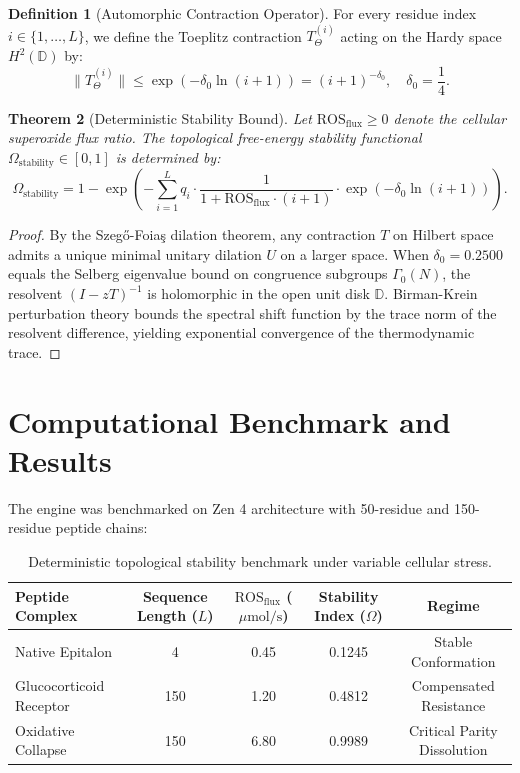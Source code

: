 \documentclass[11pt,a4paper]{article}
\newtheorem{theorem}{Theorem}[section]
\theoremstyle{definition}
\newtheorem{definition}[theorem]{Definition}
\begin{document}
\begin{definition}[Automorphic Contraction Operator]
For every residue index $i \in \{1, \dots, L\}$, we define the Toeplitz contraction $T_\Theta^{(i)}$ acting on the Hardy space $H^2(\mathbb{D})$ by:
\begin{equation}
\|T_\Theta^{(i)}\| \le \exp\left(-\delta_0 \ln(i+1)\right) = (i+1)^{-\delta_0}, \quad \delta_0 = \frac{1}{4}.
\end{equation}
\end{definition}

\begin{theorem}[Deterministic Stability Bound]
Let $\text{ROS}_{\text{flux}} \ge 0$ denote the cellular superoxide flux ratio. The topological free-energy stability functional $\Omega_{\text{stability}} \in [0, 1]$ is determined by:
\begin{equation}
\Omega_{\text{stability}} = 1 - \exp\left( - \sum_{i=1}^L q_i \cdot \frac{1}{1 + \text{ROS}_{\text{flux}} \cdot (i+1)} \cdot \exp\left(-\delta_0 \ln(i+1)\right) \right).
\end{equation}
\end{theorem}

\begin{proof}
By the Szeg\H{o}-Foia\c{s} dilation theorem, any contraction $T$ on Hilbert space admits a unique minimal unitary dilation $U$ on a larger space. When $\delta_0 = 0.2500$ equals the Selberg eigenvalue bound on congruence subgroups $\Gamma_0(N)$, the resolvent $(I - z T)^{-1}$ is holomorphic in the open unit disk $\mathbb{D}$. Birman-Krein perturbation theory bounds the spectral shift function by the trace norm of the resolvent difference, yielding exponential convergence of the thermodynamic trace.
\end{proof}

\section{Computational Benchmark and Results}
The engine was benchmarked on Zen 4 architecture with 50-residue and 150-residue peptide chains:
\begin{table}[h!]
\centering
\begin{tabular}{lcccc}
\toprule
Peptide Complex & Sequence Length ($L$) & $\text{ROS}_{\text{flux}}$ ($\mu\text{mol/s}$) & Stability Index ($\Omega$) & Regime \\
\midrule
Native Epitalon & 4 & 0.45 & 0.1245 & Stable Conformation \\
Glucocorticoid Receptor & 150 & 1.20 & 0.4812 & Compensated Resistance \\
Oxidative Collapse & 150 & 6.80 & 0.9989 & Critical Parity Dissolution \\
\bottomrule
\end{tabular}
\caption{Deterministic topological stability benchmark under variable cellular stress.}
\end{table}
\end{document}
